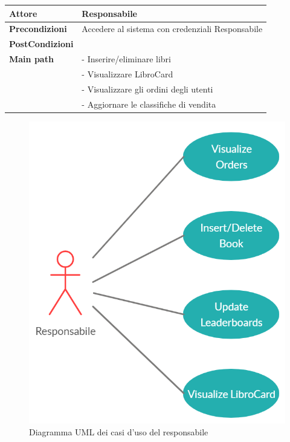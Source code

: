 \documentclass[a4paper,12pt,titlepage]{article}
\begin{document}
{{\vspace{0.3cm}
	{\renewcommand\arraystretch{1.5}{
	\renewcommand\tabcolsep{0pt}{
	\begin{table}[H]			
			\begin{tabular}{p{5cm} p{10cm} }
			\hline
			\textbf{Attore} & \textbf{Responsabile} \\ \hline
			\textbf{Precondizioni} & Accedere al sistema con credenziali Responsabile\\ \hline
			\textbf{PostCondizioni} &  \\ \hline
			\textbf{Main path} & - Inserire/eliminare libri\\
			& - Visualizzare LibroCard\\
			& - Visualizzare gli ordini degli utenti\\
			& - Aggiornare le classifiche di vendita\\ \hline
			 \end{tabular}
		\end{table}
	}}
\vspace{1cm}
\begin{figure}[H]
		\centering
		\includegraphics[scale=0.75]{useCaseResponsabile}
		\caption{Diagramma UML dei casi d'uso del responsabile }
\end{figure}


}}}
\end{document}
